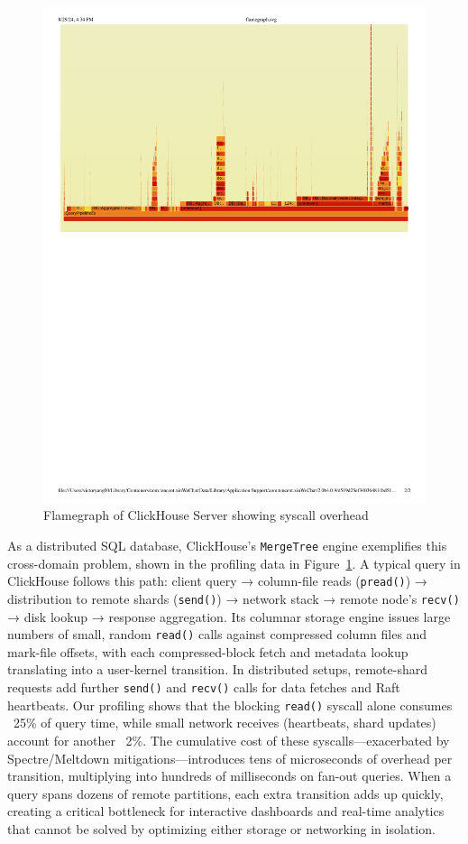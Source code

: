 \documentclass[sigconf,10pt]{acmart}
\begin{document}
\begin{figure}[h]
\centering
\includegraphics[width=\columnwidth]{img/flamegraph.pdf}
\caption{Flamegraph of ClickHouse Server showing syscall overhead}\label{fig:profiling}
\end{figure}

As a distributed SQL database, ClickHouse's\cite{clickhouse} \texttt{MergeTree} engine exemplifies this cross-domain problem, shown in the profiling data in Figure~\ref{fig:profiling}. A typical query in ClickHouse follows this path: client query → column-file reads (\texttt{pread()}) → distribution to remote shards (\texttt{send()}) → network stack → remote node's \texttt{recv()} → disk lookup → response aggregation. Its columnar storage engine issues large numbers of small, random \texttt{read()} calls against compressed column files and mark-file offsets, with each compressed-block fetch and metadata lookup translating into a user-kernel transition. In distributed setups, remote-shard requests add further \texttt{send()} and \texttt{recv()} calls for data fetches and Raft heartbeats. Our profiling shows that the blocking \texttt{read()} syscall alone consumes ~25\% of query time, while small network receives (heartbeats, shard updates) account for another ~2\%. The cumulative cost of these syscalls—exacerbated by Spectre/Meltdown mitigations—introduces tens of microseconds of overhead per transition, multiplying into hundreds of milliseconds on fan-out queries. When a query spans dozens of remote partitions, each extra transition adds up quickly, creating a critical bottleneck for interactive dashboards and real-time analytics that cannot be solved by optimizing either storage or networking in isolation.
\end{document}
